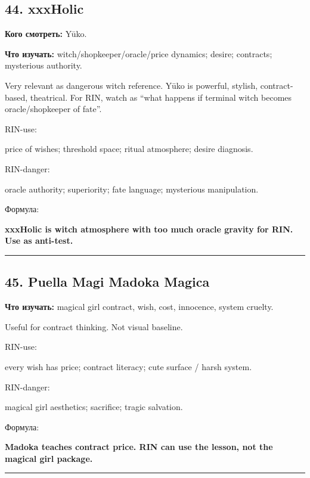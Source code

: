 \subsection*{44. xxxHolic}

\textbf{Кого смотреть:} Yūko.

\textbf{Что изучать:} witch/\hspace{0pt}shopkeeper/\hspace{0pt}oracle/\hspace{0pt}price dynamics; desire;
contracts; mysterious authority.

Very relevant as dangerous witch reference. Yūko is powerful, stylish,
contract-based, theatrical. For RIN, watch as ``what happens if terminal
witch becomes oracle/\hspace{0pt}shopkeeper of fate''.

RIN-use:

price of wishes; threshold space; ritual atmosphere; desire diagnosis.

RIN-danger:

oracle authority; superiority; fate language; mysterious manipulation.

Формула:

\textbf{xxxHolic is witch atmosphere with too much oracle gravity for
RIN. Use as anti-test.}

\begin{center}\rule{0.5\linewidth}{0.5pt}\end{center}

\subsection*{45. Puella Magi Madoka Magica}

\textbf{Что изучать:} magical girl contract, wish, cost, innocence,
system cruelty.

Useful for contract thinking. Not visual baseline.

RIN-use:

every wish has price; contract literacy; cute surface /\hspace{0pt} harsh system.

RIN-danger:

magical girl aesthetics; sacrifice; tragic salvation.

Формула:

\textbf{Madoka teaches contract price. RIN can use the lesson, not the
magical girl package.}

\begin{center}\rule{0.5\linewidth}{0.5pt}\end{center}

